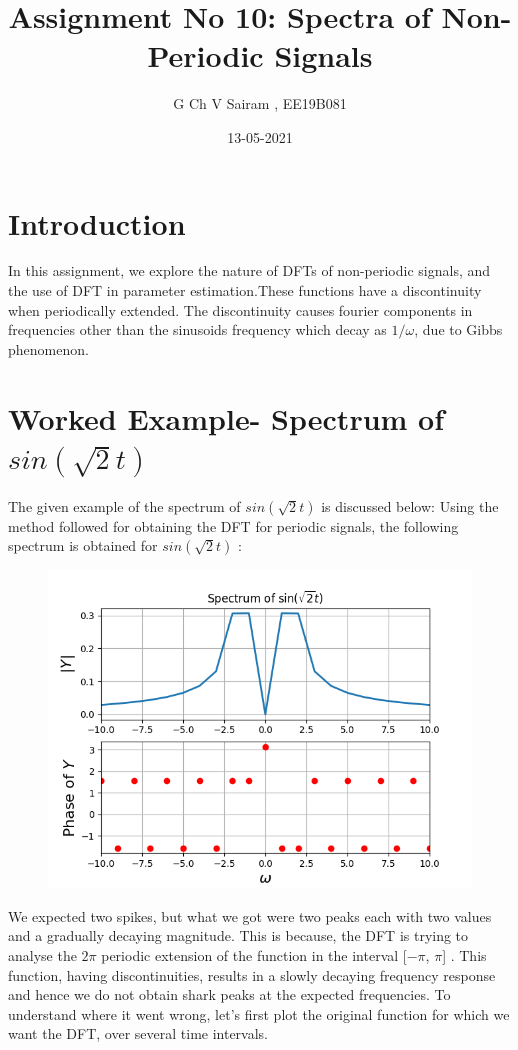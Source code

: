 \documentclass[11pt, a4paper]{article}
\title{Assignment No 10: Spectra of Non-Periodic Signals}
\author{G Ch V Sairam , EE19B081}
\date{13-05-2021}
\begin{document}
		
		
\maketitle
\section*{Introduction}
In this assignment, we explore the nature of DFTs of non-periodic signals, and the use of DFT in parameter estimation.These functions have a discontinuity when periodically extended. The discontinuity causes fourier components in frequencies other than the sinusoids frequency which decay as $1/\omega$, due to Gibbs phenomenon. 

\section*{Worked Example- Spectrum of $sin(\sqrt{2}t)$}
The given example of the spectrum of $sin(\sqrt{2}t)$ is discussed below:
Using the method followed for obtaining the DFT for periodic signals, the
following spectrum is obtained for $sin(\sqrt{2}t)$ :
 
\begin{figure}[!tbh]
\centering
\includegraphics[scale=0.6]{assgn10_plot1.png} 
\label{fig1}
\end{figure} 

We expected two spikes, but what we got were two peaks each with two values and a gradually decaying magnitude. This is because, the DFT is trying to analyse the $2\pi$ periodic extension of the function in the interval [$-\pi$, $\pi$] . This function, having discontinuities, results in a slowly decaying frequency response and hence we do not obtain shark peaks at the expected frequencies. 
\newline
To understand where it went wrong, let's first plot the original function for which we want the DFT, over several time intervals.
 
\end{document}
